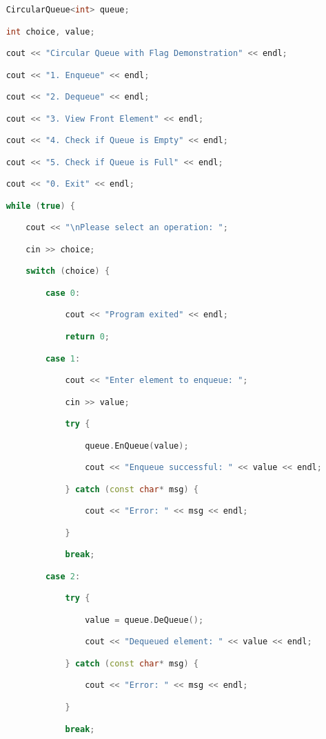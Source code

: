 \begin{lstlisting}[language=C++]
    CircularQueue<int> queue;

    int choice, value;

    cout << "Circular Queue with Flag Demonstration" << endl;

    cout << "1. Enqueue" << endl;

    cout << "2. Dequeue" << endl;

    cout << "3. View Front Element" << endl;

    cout << "4. Check if Queue is Empty" << endl;

    cout << "5. Check if Queue is Full" << endl;

    cout << "0. Exit" << endl;

    while (true) {

        cout << "\nPlease select an operation: ";

        cin >> choice;

        switch (choice) {

            case 0:

                cout << "Program exited" << endl;

                return 0;

            case 1:

                cout << "Enter element to enqueue: ";

                cin >> value;

                try {

                    queue.EnQueue(value);

                    cout << "Enqueue successful: " << value << endl;

                } catch (const char* msg) {

                    cout << "Error: " << msg << endl;

                }

                break;

            case 2:

                try {

                    value = queue.DeQueue();

                    cout << "Dequeued element: " << value << endl;

                } catch (const char* msg) {

                    cout << "Error: " << msg << endl;

                }

                break;


\end{lstlisting}
